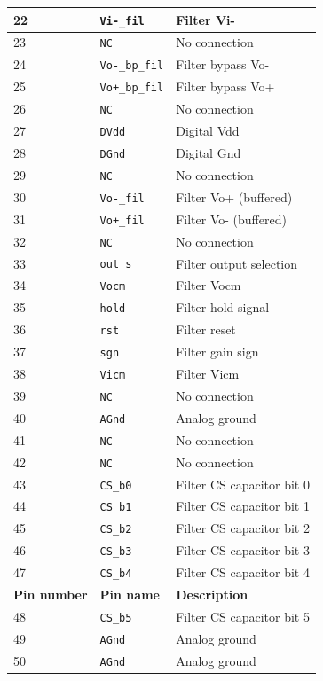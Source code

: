 \begin{center}
\begin{longtable}{|l|l|l|}
22 & \verb=Vi-_fil= & Filter Vi- \\\hline
23 & \verb=NC= & No connection \\\hline
24 & \verb=Vo-_bp_fil= & Filter bypass Vo- \\\hline
25 & \verb=Vo+_bp_fil= & Filter bypass Vo+  \\\hline
26 & \verb=NC= & No connection \\\hline
27 & \verb=DVdd= & Digital Vdd \\\hline
28 & \verb=DGnd= & Digital Gnd \\\hline
29 & \verb=NC= & No connection \\\hline
30 & \verb=Vo-_fil= & Filter Vo+ (buffered) \\\hline
31 & \verb=Vo+_fil= & Filter Vo- (buffered) \\\hline
32 & \verb=NC= & No connection \\\hline
33 & \verb=out_s= & Filter output selection \\\hline
34 & \verb=Vocm= & Filter Vocm \\\hline
35 & \verb=hold= & Filter hold signal  \\\hline
36 & \verb=rst= & Filter reset \\\hline
37 & \verb=sgn= & Filter gain sign \\\hline
38 & \verb=Vicm= & Filter Vicm \\\hline
39 & \verb=NC= & No connection \\\hline
40 & \verb=AGnd= & Analog ground \\\hline
41 & \verb=NC= & No connection \\\hline
42 & \verb=NC= & No connection \\\hline
43 & \verb=CS_b0= & Filter CS capacitor bit 0 \\\hline
44 & \verb=CS_b1= & Filter CS capacitor bit 1 \\\hline
45 & \verb=CS_b2= & Filter CS capacitor bit 2 \\\hline
46 & \verb=CS_b3= & Filter CS capacitor bit 3 \\\hline
47 & \verb=CS_b4= & Filter CS capacitor bit 4 \\\hline
{\bf Pin number} & {\bf Pin name} & {\bf Description} \\ \hline\hline
48 & \verb=CS_b5= & Filter CS capacitor bit 5 \\\hline
49 & \verb=AGnd= & Analog ground \\\hline
50 & \verb=AGnd= & Analog ground \\\hline

\end{longtable}
\end{center}
